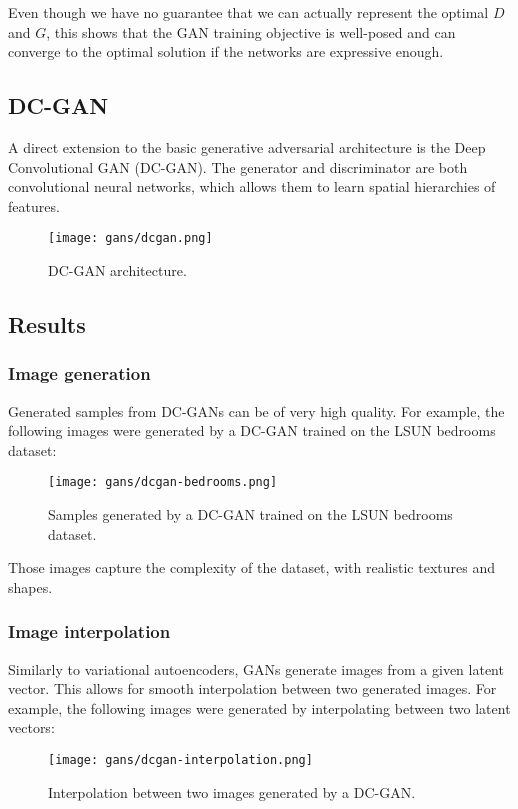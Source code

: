 Even though we have no guarantee that we can actually represent the optimal $D$ and $G$, this shows that the GAN training objective is well-posed and can converge to the optimal solution if the networks are expressive enough.

\subsection{DC-GAN}
A direct extension to the basic generative adversarial architecture is the Deep Convolutional GAN (DC-GAN). The generator and discriminator are both convolutional neural networks, which allows them to learn spatial hierarchies of features.
\begin{figure}[H]
    \centering
    \texttt{[image: gans/dcgan.png]}
    \caption{DC-GAN architecture.}
\end{figure}

\subsection{Results}
\subsubsection{Image generation}
Generated samples from DC-GANs can be of very high quality. For example, the following images were generated by a DC-GAN trained on the LSUN bedrooms dataset:
\begin{figure}[H]
    \centering
    \texttt{[image: gans/dcgan-bedrooms.png]}
    \caption{Samples generated by a DC-GAN trained on the LSUN bedrooms dataset.}
\end{figure}
Those images capture the complexity of the dataset, with realistic textures and shapes.

\subsubsection{Image interpolation}
Similarly to variational autoencoders, GANs generate images from a given latent vector. This allows for smooth interpolation between two generated images. For example, the following images were generated by interpolating between two latent vectors:
\begin{figure}[H]
    \centering
    \texttt{[image: gans/dcgan-interpolation.png]}
    \caption{Interpolation between two images generated by a DC-GAN.}
\end{figure}

